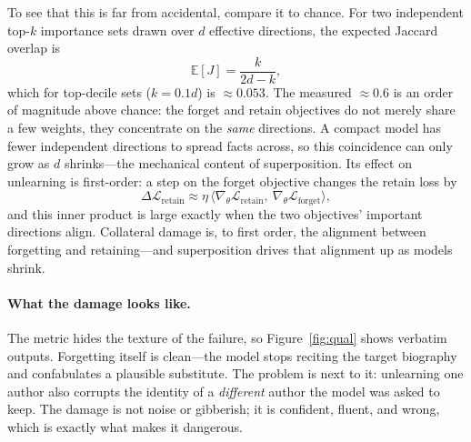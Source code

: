 \documentclass[sigconf,nonacm]{acmart}
\begin{document}
To see that this is far from accidental, compare it to chance. For two independent top-$k$ importance sets drawn over $d$ effective directions, the expected Jaccard overlap is
\begin{equation}
\mathbb{E}[J] = \frac{k}{2d-k},
\end{equation}
which for top-decile sets ($k=0.1d$) is $\approx 0.053$. The measured $\approx 0.6$ is an order of magnitude above chance: the forget and retain objectives do not merely share a few weights, they concentrate on the \emph{same} directions. A compact model has fewer independent directions to spread facts across, so this coincidence can only grow as $d$ shrinks---the mechanical content of superposition. Its effect on unlearning is first-order: a step on the forget objective changes the retain loss by
\begin{equation}
\Delta\mathcal{L}_{\mathrm{retain}} \approx \eta\,\big\langle \nabla_\theta\mathcal{L}_{\mathrm{retain}},\ \nabla_\theta\mathcal{L}_{\mathrm{forget}}\big\rangle,
\label{eq:damage}
\end{equation}
and this inner product is large exactly when the two objectives' important directions align. Collateral damage is, to first order, the alignment between forgetting and retaining---and superposition drives that alignment up as models shrink.

\paragraph{What the damage looks like.} The metric hides the texture of the failure, so Figure~\ref{fig:qual} shows verbatim outputs. Forgetting itself is clean---the model stops reciting the target biography and confabulates a plausible substitute. The problem is next to it: unlearning one author also corrupts the identity of a \emph{different} author the model was asked to keep. The damage is not noise or gibberish; it is confident, fluent, and wrong, which is exactly what makes it dangerous.
\end{document}
